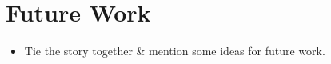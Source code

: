 \documentclass[11pt, a4paper]{report}
\begin{document}
\chapter{Future Work}
\label{cha:future-work}

\begin{itemize}
\item Tie the story together \& mention some ideas for future
  work.
\end{itemize}


% 
% 
% 
% 
% 
% 
% 
% 


\end{document}
